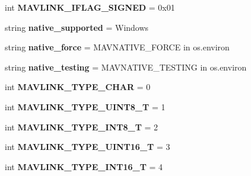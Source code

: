 \begin{DoxyCompactItemize}
int {\bfseries M\+A\+V\+L\+I\+N\+K\+\_\+\+I\+F\+L\+A\+G\+\_\+\+S\+I\+G\+N\+ED} = 0x01
\item 
\mbox{\label{namespacepymavlink_1_1dialects_1_1v10_ac288be7a7f5889f844f63158b3215067}} 
string {\bfseries native\+\_\+supported} = \textquotesingle{}Windows\textquotesingle{}
\item 
\mbox{\label{namespacepymavlink_1_1dialects_1_1v10_a85e19dd18f89d8cf838509e79ef84fd9}} 
string {\bfseries native\+\_\+force} = \textquotesingle{}M\+A\+V\+N\+A\+T\+I\+V\+E\+\_\+\+F\+O\+R\+CE\textquotesingle{} in os.\+environ
\item 
\mbox{\label{namespacepymavlink_1_1dialects_1_1v10_aaebb4b17558f846cf3f81c6e36dca040}} 
string {\bfseries native\+\_\+testing} = \textquotesingle{}M\+A\+V\+N\+A\+T\+I\+V\+E\+\_\+\+T\+E\+S\+T\+I\+NG\textquotesingle{} in os.\+environ
\item 
\mbox{\label{namespacepymavlink_1_1dialects_1_1v10_a10ef56e21ec15b90648174db03b51f5d}} 
int {\bfseries M\+A\+V\+L\+I\+N\+K\+\_\+\+T\+Y\+P\+E\+\_\+\+C\+H\+AR} = 0
\item 
\mbox{\label{namespacepymavlink_1_1dialects_1_1v10_a56f4e3a7281b7b47e79cdad1d17a7ef1}} 
int {\bfseries M\+A\+V\+L\+I\+N\+K\+\_\+\+T\+Y\+P\+E\+\_\+\+U\+I\+N\+T8\+\_\+T} = 1
\item 
\mbox{\label{namespacepymavlink_1_1dialects_1_1v10_a3d710d4fa8169ac59b6a1c5f141eac4c}} 
int {\bfseries M\+A\+V\+L\+I\+N\+K\+\_\+\+T\+Y\+P\+E\+\_\+\+I\+N\+T8\+\_\+T} = 2
\item 
\mbox{\label{namespacepymavlink_1_1dialects_1_1v10_ae9d9b9873bbf98094f15940417616bb7}} 
int {\bfseries M\+A\+V\+L\+I\+N\+K\+\_\+\+T\+Y\+P\+E\+\_\+\+U\+I\+N\+T16\+\_\+T} = 3
\item 
\mbox{\label{namespacepymavlink_1_1dialects_1_1v10_af3b5f1223982a6afb64d224983e9071f}} 
int {\bfseries M\+A\+V\+L\+I\+N\+K\+\_\+\+T\+Y\+P\+E\+\_\+\+I\+N\+T16\+\_\+T} = 4

\end{DoxyCompactItemize}
